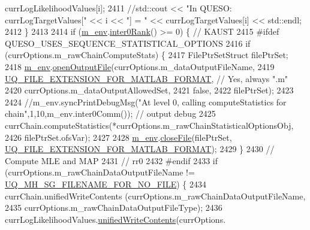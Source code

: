 \begin{DoxyCode}
       currLogLikelihoodValues[i];
2411       \textcolor{comment}{//std::cout << "In QUESO: currLogTargetValues[" << i << "] = " << currLogTargetValues[i] <<
       std::endl;}
2412     \}
2413 
2414     \textcolor{keywordflow}{if} (\hyperlink{class_q_u_e_s_o_1_1_m_l_sampling_a13f1ca4fe9f94822fe572a743eaced1d}{m\_env}.\hyperlink{class_q_u_e_s_o_1_1_base_environment_ae106b5bb8a80b655b88b3a26b1e7c185}{inter0Rank}() >= 0) \{ \textcolor{comment}{// KAUST}
2415 \textcolor{preprocessor}{#ifdef QUESO\_USES\_SEQUENCE\_STATISTICAL\_OPTIONS}
2416 \textcolor{preprocessor}{}      \textcolor{keywordflow}{if} (currOptions.m\_rawChainComputeStats) \{
2417         FilePtrSetStruct filePtrSet;
2418         \hyperlink{class_q_u_e_s_o_1_1_m_l_sampling_a13f1ca4fe9f94822fe572a743eaced1d}{m\_env}.\hyperlink{class_q_u_e_s_o_1_1_base_environment_ab8fe853074f12ea34e18724119a2fc75}{openOutputFile}(currOptions.m\_dataOutputFileName,
2419                              \hyperlink{_defines_8h_ac440026eff7deb1c1eed1eea0e8e36ba}{UQ\_FILE\_EXTENSION\_FOR\_MATLAB\_FORMAT}, \textcolor{comment}{//
       Yes, always ".m"}
2420                              currOptions.m\_dataOutputAllowedSet,
2421                              \textcolor{keyword}{false},
2422                              filePtrSet);
2423 
2424         \textcolor{comment}{//m\_env.syncPrintDebugMsg("At level 0, calling computeStatistics for
       chain",1,10,m\_env.inter0Comm()); // output debug}
2425         currChain.computeStatistics(*currOptions.m\_rawChainStatisticalOptionsObj,
2426                                     filePtrSet.ofsVar);
2427 
2428         \hyperlink{class_q_u_e_s_o_1_1_m_l_sampling_a13f1ca4fe9f94822fe572a743eaced1d}{m\_env}.\hyperlink{class_q_u_e_s_o_1_1_base_environment_ab712bff194ddd91459d4ea8715c77e8b}{closeFile}(filePtrSet,
      \hyperlink{_defines_8h_ac440026eff7deb1c1eed1eea0e8e36ba}{UQ\_FILE\_EXTENSION\_FOR\_MATLAB\_FORMAT});
2429       \}
2430       \textcolor{comment}{// Compute MLE and MAP}
2431       \textcolor{comment}{// rr0}
2432 \textcolor{preprocessor}{#endif}
2433 \textcolor{preprocessor}{}      \textcolor{keywordflow}{if} (currOptions.m\_rawChainDataOutputFileName != 
      \hyperlink{_metropolis_hastings_s_g_options_8h_a75699ceb938d800e2b7f59ede3ea9a31}{UQ\_MH\_SG\_FILENAME\_FOR\_NO\_FILE}) \{
2434         currChain.unifiedWriteContents              (currOptions.m\_rawChainDataOutputFileName,
2435                                                      currOptions.m\_rawChainDataOutputFileType);
2436         currLogLikelihoodValues.\hyperlink{class_q_u_e_s_o_1_1_scalar_sequence_a2f832dd5eda37df06eb52650ab8ce733}{unifiedWriteContents}(currOptions.

\end{DoxyCode}

